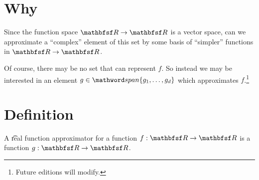 

\section*{Why}

Since the function space $\R  \to \R $ is a vector space, can we approximate a ``complex'' element of this set by some basis of ``simpler'' functions in $\R  \to \R $.

Of course, there may be no set that can represent $f$.
So instead we may be interested in an element $g \in \span\set{g_1, \dots , g_d}$ which approximates $f$.\footnote{Future editions will modify.}

\section*{Definition}

A \t{real function approximator} for a function $f: \R  \to \R $ is a function $g: \R  \to \R $.

\blankpage